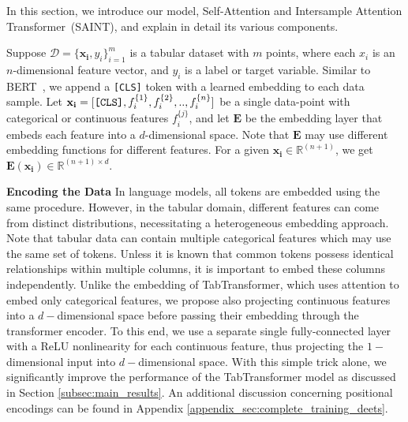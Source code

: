 \documentclass{article}
\newcommand{\micah}[1]{\textcolor{purple}{#1}}
\newcommand{\avi}[1]{\textcolor{blue}{#1}}
\begin{document}
In this section, we introduce our model, Self-Attention and Intersample Attention Transformer~(SAINT), and explain in detail its various components.


Suppose $\mathcal{D} = \{\mathbf{x_i},y_i\}_{i=1}^m$ is a tabular dataset with $m$ points, where each ${x_i}$ is an $n$-dimensional feature vector, and ${y_i}$ is a label or target variable. Similar to BERT~\citep{devlin2018bert}, we append a \verb|[CLS]| token with a learned embedding to each data sample. Let $\mathbf{x_i} = [\verb|[CLS]|, f_i^{\{1\}}, f_i^{\{2\}},  ..,f_i^{\{n\}}]$ be a single data-point with categorical or continuous features $f_i^{\{j\}}$, and let $\mathbf{E}$ be the embedding layer that embeds each feature into a $d$-dimensional space.  Note that $\mathbf{E}$ may use different embedding functions for different features. For a given $\mathbf{x_i} \in \mathbb{R}^{(n+1)}$, we get $\mathbf{E}(\mathbf{x_i}) \in \mathbb{R}^{(n+1) \times d}$.

\textbf{Encoding the Data} In language models, all tokens are embedded using the same procedure. However, in the tabular domain, different features can come from distinct distributions, necessitating a heterogeneous embedding approach.  Note that tabular data can contain multiple categorical features which may use the same set of tokens. Unless it is known that common tokens possess identical relationships within multiple columns, it is important to embed these columns independently.  Unlike the embedding of TabTransformer\cite{huang2020tabtransformer}, which uses attention to embed only categorical features, we propose also projecting continuous features into a $d-$dimensional space before passing their embedding through the transformer encoder. To this end, we use a separate single fully-connected layer with a ReLU nonlinearity for each continuous feature, thus projecting the $1-$dimensional input into $d-$dimensional space. With this simple trick alone, we significantly improve the performance of the TabTransformer model as discussed in Section \ref{subsec:main_results}. An additional discussion concerning positional encodings can be found in Appendix \ref{appendix_sec:complete_training_deets}.
 
\end{document}
